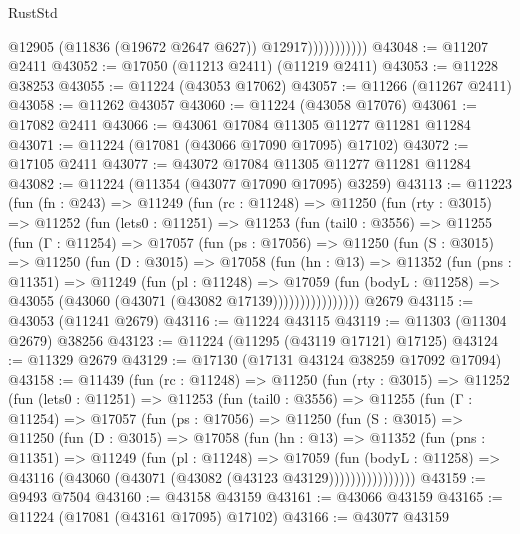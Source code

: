 \begin{lexlean}{RustStd}
\begin{coremodule}
                          @12905
                          (@11836 (@19672 @2647 @627))
                          @12917)))))))))))
@43048 := @11207 @2411
@43052 := @17050 (@11213 @2411) (@11219 @2411)
@43053 := @11228 @38253
@43055 := @11224 (@43053 @17062)
@43057 := @11266 (@11267 @2411)
@43058 := @11262 @43057
@43060 := @11224 (@43058 @17076)
@43061 := @17082 @2411
@43066 := @43061 @17084 @11305 @11277 @11281 @11284
@43071 := @11224 (@17081 (@43066 @17090 @17095) @17102)
@43072 := @17105 @2411
@43077 := @43072 @17084 @11305 @11277 @11281 @11284
@43082 := @11224 (@11354 (@43077 @17090 @17095) @3259)
@43113 := @11223
    (fun (fn : @243) =>
    @11249
      (fun (rc : @11248) =>
      @11250
        (fun (rty : @3015) =>
        @11252
          (fun (lets0 : @11251) =>
          @11253
            (fun (tail0 : @3556) =>
            @11255
              (fun (Γ : @11254) =>
              @17057
                (fun (ps : @17056) =>
                @11250
                  (fun (S : @3015) =>
                  @11250
                    (fun (D : @3015) =>
                    @17058
                      (fun (hn : @13) =>
                      @11352
                        (fun (pns : @11351) =>
                        @11249
                          (fun (pl : @11248) =>
                          @17059
                            (fun (bodyL : @11258) =>
                            @43055 (@43060 (@43071 (@43082 @17139))))))))))))))))
    @2679
@43115 := @43053 (@11241 @2679)
@43116 := @11224 @43115
@43119 := @11303 (@11304 @2679) @38256
@43123 := @11224 (@11295 (@43119 @17121) @17125)
@43124 := @11329 @2679
@43129 := @17130 (@17131 @43124 @38259 @17092 @17094)
@43158 := @11439
    (fun (rc : @11248) =>
    @11250
      (fun (rty : @3015) =>
      @11252
        (fun (lets0 : @11251) =>
        @11253
          (fun (tail0 : @3556) =>
          @11255
            (fun (Γ : @11254) =>
            @17057
              (fun (ps : @17056) =>
              @11250
                (fun (S : @3015) =>
                @11250
                  (fun (D : @3015) =>
                  @17058
                    (fun (hn : @13) =>
                    @11352
                      (fun (pns : @11351) =>
                      @11249
                        (fun (pl : @11248) =>
                        @17059
                          (fun (bodyL : @11258) =>
                          @43116 (@43060 (@43071 (@43082 (@43123 @43129))))))))))))))))
@43159 := @9493 @7504
@43160 := @43158 @43159
@43161 := @43066 @43159
@43165 := @11224 (@17081 (@43161 @17095) @17102)
@43166 := @43077 @43159

\end{coremodule}
\end{lexlean}
